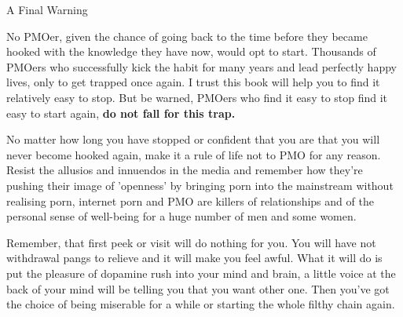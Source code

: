 A Final Warning

No PMOer, given the chance of going back to the time before they became hooked with the knowledge they have now, would opt to start. Thousands of PMOers who successfully kick the habit for many years and lead perfectly happy lives, only to get trapped once again. I trust this book will help you to find it relatively easy to stop. But be warned, PMOers who find it easy to stop find it easy to start again, \textbf{do not fall for this trap.}

No matter how long you have stopped or confident that you are that you will never become hooked again, make it a rule of life not to PMO for any reason. Resist the allusios and innuendos in the media and remember how they're pushing their image of 'openness' by bringing porn into the mainstream without realising porn, internet porn and PMO are killers of relationships and of the personal sense of well-being for a huge number of men and some women.

Remember, that first peek or visit will do nothing for you. You will have not withdrawal pangs to relieve and it will make you feel awful. What it will do is put the pleasure of dopamine rush into your mind and brain, a little voice at the back of your mind will be telling you that you want other one. Then you've got the choice of being miserable for a while or starting the whole filthy chain again.
